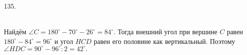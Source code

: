 135. \begin{figure}[ht!]
\end{figure}\\
Найдём $\angle C=180^\circ-70^\circ-26^\circ=84^\circ.$ Тогда внешний угол при вершине $C$ равен $180^\circ-84^\circ=96^\circ$ и угол $HCD$ равен его половине как вертикальный. Поэтому $\angle HDC=90^\circ-96^\circ:2=42^\circ.$\\
